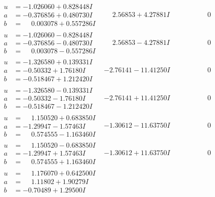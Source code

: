 \documentclass[1p]{elsarticle_modified}
\theoremstyle{definition}
\begin{document}
$$\begin{array}{c|c|c}
 \hline 
\begin{aligned}
u &= -1.026060 + 0.828448 I \\
a &= -0.376856 + 0.480730 I \\
b &= \phantom{-}0.003078 + 0.557286 I\end{aligned}
 & \phantom{-}2.56853 + 4.27881 I & \phantom{-0.000000 } 0 \\ \hline\begin{aligned}
u &= -1.026060 - 0.828448 I \\
a &= -0.376856 - 0.480730 I \\
b &= \phantom{-}0.003078 - 0.557286 I\end{aligned}
 & \phantom{-}2.56853 - 4.27881 I & \phantom{-0.000000 } 0 \\ \hline\begin{aligned}
u &= -1.326580 + 0.139331 I \\
a &= -0.50332 + 1.76180 I \\
b &= -0.518467 + 1.212420 I\end{aligned}
 & -2.76141 - 11.41250 I & \phantom{-0.000000 } 0 \\ \hline\begin{aligned}
u &= -1.326580 - 0.139331 I \\
a &= -0.50332 - 1.76180 I \\
b &= -0.518467 - 1.212420 I\end{aligned}
 & -2.76141 + 11.41250 I & \phantom{-0.000000 } 0 \\ \hline\begin{aligned}
u &= \phantom{-}1.150520 + 0.683850 I \\
a &= -1.29947 - 1.57463 I \\
b &= \phantom{-}0.574555 - 1.163460 I\end{aligned}
 & -1.30612 - 11.63750 I & \phantom{-0.000000 } 0 \\ \hline\begin{aligned}
u &= \phantom{-}1.150520 - 0.683850 I \\
a &= -1.29947 + 1.57463 I \\
b &= \phantom{-}0.574555 + 1.163460 I\end{aligned}
 & -1.30612 + 11.63750 I & \phantom{-0.000000 } 0 \\ \hline\begin{aligned}
u &= \phantom{-}1.176070 + 0.642500 I \\
a &= \phantom{-}1.11802 + 1.90279 I \\
b &= -0.70489 + 1.29500 I\end{aligned}

\end{array}$$
\end{document}

